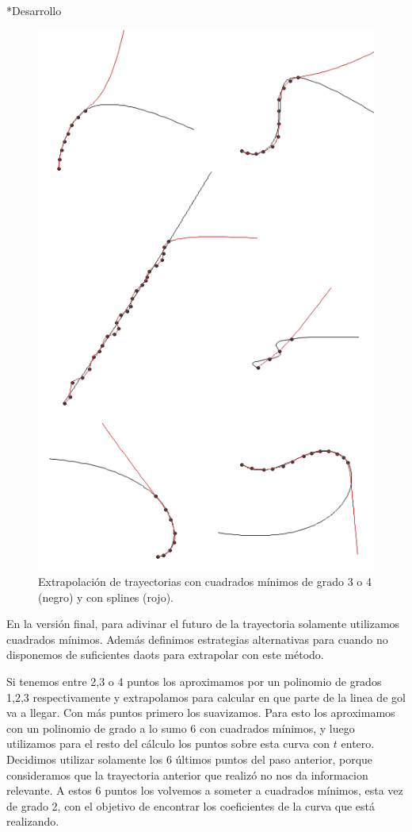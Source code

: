 \documentclass[12pt,titlepage]{article}
\newenvironment{usection}[1]{\newpage\begin{section}*{#1}	\addcontentsline{toc}{section}{#1}}{\end{section}}
\begin{document}
\begin{usection}{Desarrollo}
		\begin{figure}[H]
			\centering
			\includegraphics[scale=0.75]{img/extrap.png}
			\caption{
				Extrapolación de trayectorias con cuadrados mínimos de grado 3 o 4 (negro) y con splines (rojo).
			}
			\label{fig:extrap}
		\end{figure}
	\end{usection}
	
	En la versión final, para adivinar el futuro de la trayectoria solamente utilizamos cuadrados mínimos.
	Además definimos estrategias alternativas para cuando no disponemos de suficientes daots para extrapolar con este método.
	
	Si tenemos entre 2,3 o 4 puntos los aproximamos por un polinomio de grados 1,2,3 respectivamente y extrapolamos para calcular en que parte de la linea de gol va a llegar.
	Con más puntos primero los suavizamos. Para esto los aproximamos con un polinomio de grado a lo sumo 6 con cuadrados mínimos, y luego utilizamos para el resto del cálculo los puntos sobre esta curva con $t$ entero.
	Decidimos utilizar solamente los 6 últimos puntos del paso anterior, porque consideramos que la trayectoria anterior que realizó no nos da informacion relevante.
	A estos 6 puntos los volvemos a someter a cuadrados mínimos, esta vez de grado 2, con el objetivo de encontrar los coeficientes de la curva que está realizando.
	
\end{document}
